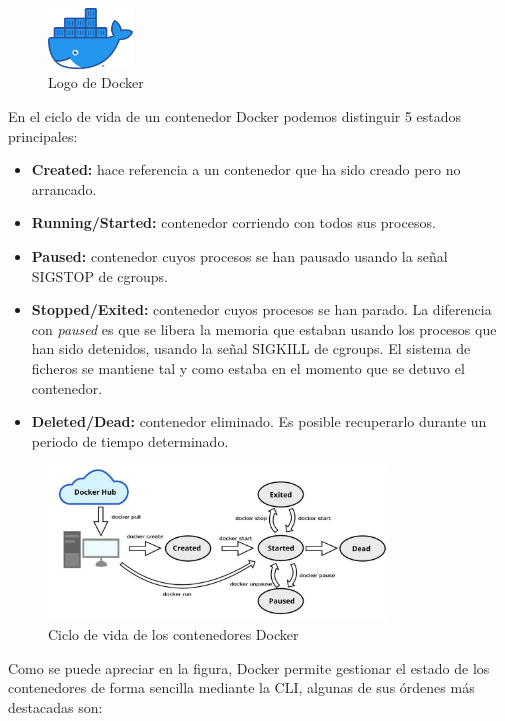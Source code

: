	\begin{figure}[h]
	\centering
	\includegraphics[width=0.2\textwidth]{../imgs/EdA/docker.png}
	\caption{Logo de Docker}
	\label{fig:docker-logo}
	\end{figure}

	En el ciclo de vida de un contenedor Docker podemos distinguir 5 estados principales:

	\begin{itemize}
		\item \textbf{Created:} hace referencia a un contenedor que ha sido creado pero no arrancado.
		\item \textbf{Running/Started:} contenedor corriendo con todos sus procesos.
		\item \textbf{Paused:} contenedor cuyos procesos se han pausado usando la señal SIGSTOP de cgroups.
		\item \textbf{Stopped/Exited:} contenedor cuyos procesos se han parado. La diferencia con \textit{paused} es que se libera la memoria que estaban usando los procesos que han sido detenidos, usando la señal SIGKILL de cgroups. El sistema de ficheros se mantiene tal y como estaba en el momento que se detuvo el contenedor.
		\item \textbf{Deleted/Dead:} contenedor eliminado. Es posible recuperarlo durante un periodo de tiempo determinado.
	\end{itemize}

	\begin{figure}[h]
	\centering
	\includegraphics[width=0.8\textwidth]{../imgs/EdA/docker-life.jpeg}
	\caption{Ciclo de vida de los contenedores Docker}
	\label{fig:docker-life}
	\end{figure}

	Como se puede apreciar en la figura, Docker permite gestionar el estado de los contenedores de forma sencilla mediante la CLI, algunas de sus órdenes más destacadas son:

